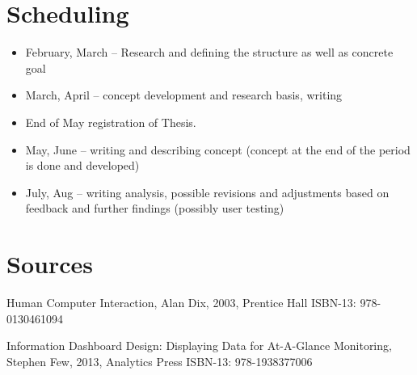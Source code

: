 \section{Scheduling}
\begin{itemize}
	\item February, March – Research and defining the structure as well as concrete goal
	\item March, April – concept development and research basis, writing
	\item End of May registration of Thesis.
	\item May, June – writing and describing concept (concept at the end of the period is done and developed)
	\item July, Aug – writing analysis, possible revisions and adjustments based on feedback and further findings (possibly user testing)
\end{itemize}


\section{Sources}

Human Computer Interaction, Alan Dix, 2003, Prentice Hall
ISBN-13: 978-0130461094

Information Dashboard Design: Displaying Data for At-A-Glance Monitoring, Stephen Few, 2013, Analytics Press
ISBN-13: 978-1938377006

